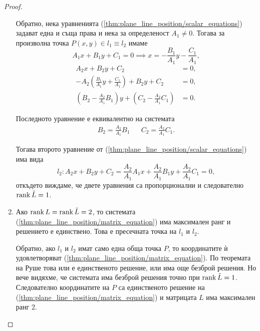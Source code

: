 \documentclass[
  headings=standardclasses,
  bibliography=totocnumbered,
]{scrartcl}
\begin{document}
\begin{proof}
\begin{enumerate}
    Обратно, нека уравненията (\eqref{thm:plane_line_position/scalar_equations}) задават една и съща права и нека за определеност \( A_1 \neq 0 \). Тогава за произволна точка \( P(x, y) \in l_1 \equiv l_2 \) имаме
    \begin{equation*}
      A_1x + B_1y + C_1 = 0
      \implies
      x = - \frac {B_1} {A_1} y - \frac {C_1} {A_1},
    \end{equation*}
    \begin{align*}
      A_2x + B_2y + C_2 &= 0,
      \\
      - A_2 \left(\frac {B_1} {A_1} y + \frac {C_1} {A_1} \right) + B_2y + C_2 &= 0,
      \\
      \left(B_2 - \frac {A_2} {A_1} B_1 \right) y + \left(C_2 - \frac {A_2} {A_1} C_1 \right) &= 0.
    \end{align*}

    Последното уравнение е еквивалентно на системата
    \begin{align*}
      B_2 = \frac {A_2} {A_1} B_1
      &&
      C_2 = \frac {A_2} {A_1} C_1.
    \end{align*}

    Тогава второто уравнение от (\eqref{thm:plane_line_position/scalar_equations}) има вида
    \begin{equation*}
      l_2:
      A_2 x + B_2 y + C_2 =
      \frac {A_2} {A_1} A_1 x + \frac {A_2} {A_1} B_1 y + \frac {A_2} {A_1} C_1
      = 0,
    \end{equation*}
    откъдето виждаме, че двете уравнения са пропорционални и следователно \( \operatorname{rank} \tilde L = 1 \).

    \item Ако \( \operatorname{rank} L = \operatorname{rank} \tilde L = 2 \), то системата (\eqref{thm:plane_line_position/matrix_equation}) има максимален ранг и решението е единствено. Това е пресечната точка на \( l_1 \) и \( l_2 \).

    Обратно, ако \( l_1 \) и \( l_2 \) имат само една обща точка \( P \), то координатите ѝ удовлетворяват (\eqref{thm:plane_line_position/matrix_equation}). По теоремата на Руше това или е единственото решение, или има още безброй решения. Но вече видяхме, че системата има безброй решения точно при \( \operatorname{rank} \tilde L = 1 \). Следователно координатите на \( P \) са единственото решение на (\eqref{thm:plane_line_position/matrix_equation}) и матрицата \( L \) има максимален ранг 2.
  \end{enumerate}
\end{proof}
\end{document}
